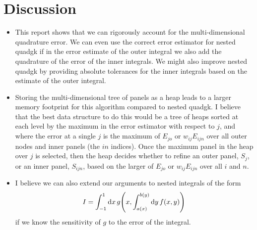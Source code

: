 \documentclass{article}
\begin{document}
\section{Discussion}

\begin{itemize}

\item    This report shows that we can rigorously account for the multi-dimensional
quadrature error. We can even use the correct error estimator for nested quadgk
if in the error estimate of the outer integral we also add the quadrature of the
error of the inner integrals. We might also improve nested quadgk by providing
absolute tolerances for the inner integrals based on the estimate of the outer
integral.

\item    Storing the multi-dimensional tree of panels as a heap leads to a
larger memory footprint for this algorithm compared to nested quadgk. I believe
that the best data structure to do this would be a tree of heaps sorted at each
level by the maximum in the error estimator with respect to $j$, and where the
error at a single $j$ is the maximum of $E_{jo}$ or $w_{ij}E_{ijn}$ over all
outer nodes and inner panels (the $in$ indices). Once the maximum panel in the
heap over $j$ is selected, then the heap decides whether to refine an outer
panel, $S_j$, or an inner panel, $S_{ijn}$, based on the larger of $E_{jo}$ or
$w_{ij}E_{ijn}$ over all $i$ and $n$.

\item    I believe we can also extend our arguments to nested integrals of the form
\begin{align}
    I = \int_{-1}^{1} \dd{x} g\qty(x, \int_{a(x)}^{b(y)} \dd{y} f(x,y))
\end{align}
if we know the sensitivity of $g$ to the error of the integral.
\end{itemize}
\end{document}
